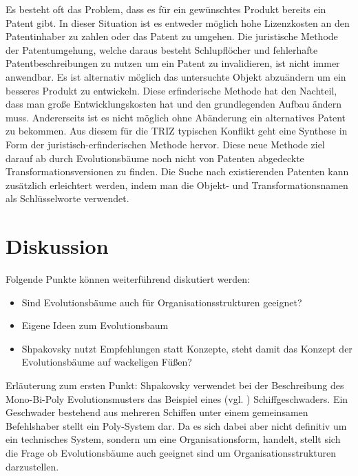 \documentclass[11pt,a4paper]{article}
\begin{document}
Es besteht oft das Problem, dass es für ein gewünschtes Produkt bereits ein Patent gibt. In dieser Situation ist es entweder möglich hohe Lizenzkosten an den Patentinhaber zu zahlen oder das Patent zu umgehen.
Die juristische Methode der Patentumgehung, welche daraus besteht Schlupflöcher und fehlerhafte Patentbeschreibungen zu nutzen um ein Patent zu invalidieren, ist nicht immer anwendbar.
Es ist alternativ möglich das untersuchte Objekt abzuändern um ein besseres Produkt zu entwickeln. Diese erfinderische Methode hat den Nachteil, dass man große Entwicklungskosten hat und den grundlegenden Aufbau ändern muss. Andererseits ist es nicht möglich ohne Abänderung ein alternatives Patent zu bekommen.
Aus diesem für die TRIZ typischen Konflikt geht eine Synthese in Form der juristisch-erfinderischen Methode hervor. Diese neue Methode ziel darauf ab durch Evolutionsbäume noch nicht von Patenten abgedeckte Transformationsversionen zu finden.
Die Suche nach existierenden Patenten kann zusätzlich erleichtert werden, indem man die Objekt- und Transformationsnamen als Schlüsselworte verwendet.


\section{Diskussion}

Folgende Punkte können weiterführend diskutiert werden:
\begin{itemize}
    \item Sind Evolutionsbäume auch für Organisationsstrukturen geeignet?
    \item Eigene Ideen zum Evolutionsbaum
    \item Shpakovsky nutzt Empfehlungen statt Konzepte, steht damit das Konzept der Evolutionsbäume auf wackeligen Füßen?
\end{itemize}

Erläuterung zum ersten Punkt: Shpakovsky verwendet bei der Beschreibung des Mono-Bi-Poly Evolutionsmusters das Beispiel eines (vgl. \cite[S. 77]{evo}) Schiffgeschwaders. Ein Geschwader bestehend aus mehreren Schiffen unter einem gemeinsamen Befehlshaber stellt ein Poly-System dar. Da es sich dabei aber nicht definitiv um ein technisches System, sondern um eine Organisationsform, handelt, stellt sich die Frage ob Evolutionsbäume auch geeignet sind um Organisationsstrukturen darzustellen. 




\end{document}
